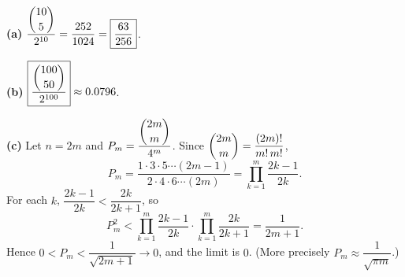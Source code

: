 \textbf{(a)} $\dfrac{\dbinom{10}{5}}{2^{10}}=\dfrac{252}{1024}=\boxed{\dfrac{63}{256}}$.

\textbf{(b)} $\boxed{\dfrac{\dbinom{100}{50}}{2^{100}}}\approx0.0796$.

\textbf{(c)} Let $n=2m$ and $P_m=\dfrac{\dbinom{2m}{m}}{4^m}$. Since $\dbinom{2m}{m}=\dfrac{(2m)!}{m!\,m!}$,
\[P_m=\dfrac{1\cdot3\cdot5\cdots(2m-1)}{2\cdot4\cdot6\cdots(2m)}=\prod_{k=1}^{m}\dfrac{2k-1}{2k}.\]
For each $k$, $\dfrac{2k-1}{2k}<\dfrac{2k}{2k+1}$, so
\[P_m^2<\prod_{k=1}^{m}\dfrac{2k-1}{2k}\cdot\prod_{k=1}^{m}\dfrac{2k}{2k+1}=\dfrac{1}{2m+1}.\]
Hence $0<P_m<\dfrac1{\sqrt{2m+1}}\to0$, and the limit is $\boxed{0}$. (More precisely $P_m\approx\dfrac1{\sqrt{\pi m}}$.)

